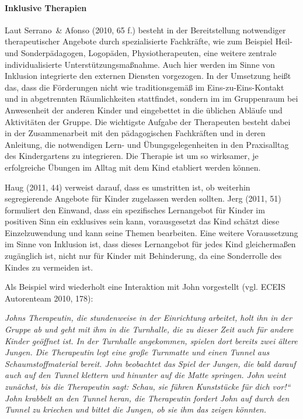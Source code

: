 \paragraph{Inklusive Therapien} Laut Serrano~\& Afonso (2010, 65 f.) besteht in der Bereitstellung notwendiger therapeutischer Angebote durch spezialisierte Fachkräfte, wie zum Beispiel Heil- und Sonderpädagogen, Logopäden, Physiotherapeuten, eine weitere zentrale individualisierte Unterstützungsmaßnahme. Auch hier werden im Sinne von Inklusion integrierte den externen Diensten vorgezogen. In der Umsetzung heißt das, dass die Förderungen nicht wie traditionsgemäß im Eins-zu-Eins-Kontakt und in abgetrennten Räumlichkeiten stattfindet, sondern im im Gruppenraum bei Anwesenheit der anderen Kinder und eingebettet in die üblichen Abläufe und Aktivitäten der Gruppe. Die wichtigste Aufgabe der Therapeuten besteht dabei in der Zusammenarbeit mit den pädagogischen Fachkräften und in deren Anleitung, die notwendigen Lern- und Übungsgelegenheiten in den Praxisalltag des Kindergartens zu integrieren. Die Therapie ist um so wirksamer, je erfolgreiche Übungen im Alltag mit dem Kind etabliert werden können.

Haug (2011, 44) verweist darauf, dass es umstritten ist, ob weiterhin segregierende Angebote für Kinder zugelassen werden sollten. Jerg (2011, 51) formuliert den Einwand, dass ein spezifisches Lernangebot für Kinder im positiven Sinn ein exklusives sein kann, vorausgesetzt das Kind schätzt diese Einzelzuwendung und kann seine Themen bearbeiten. Eine weitere Voraussetzung im Sinne von Inklusion ist, dass dieses Lernangebot für jedes Kind gleichermaßen zugänglich ist, nicht nur für Kinder mit Behinderung, da eine Sonderrolle des Kindes zu vermeiden ist. 

Als Beispiel wird wiederholt eine Interaktion mit John vorgestellt (vgl. ECEIS Autorenteam 2010, 178):

\emph{Johns Therapeutin, die stundenweise in der Einrichtung arbeitet, holt ihn in der Gruppe ab und geht mit ihm in die Turnhalle, die zu dieser Zeit auch für andere Kinder geöffnet ist. In der Turnhalle angekommen, spielen dort bereits zwei ältere Jungen. Die Therapeutin legt eine große Turnmatte und einen Tunnel aus Schaumstoffmaterial bereit. John beobachtet das Spiel der Jungen, die bald darauf auch auf den Tunnel klettern und hinunter auf die Matte springen. John weint zunächst, bis die Therapeutin sagt: Schau, sie führen Kunststücke für dich vor!“ John krabbelt an den Tunnel heran, die Therapeutin fordert John auf durch den Tunnel zu kriechen und bittet die Jungen, ob sie ihm das zeigen könnten.}

